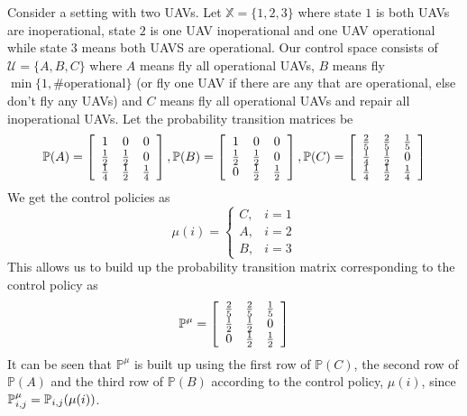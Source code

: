 \begin{example}
Consider a setting with two UAVs. Let $\mathbb{X}=\{1,2,3\}$ where state $1$ is both UAVs are inoperational, state $2$ is one UAV inoperational and one UAV operational while state $3$ means both UAVS are operational. Our control space consists of $\mathcal{U} = \{A,B,C\}$ where $A$ means fly all operational UAVs, $B$ means fly $\min\{1, \#\text{operational}\}$ (or fly one UAV if there are any that are operational, else don't fly any UAVs) and $C$ means fly all operational UAVs and repair all inoperational UAVs. Let the probability transition matrices be
\begin{align*}
\begin{split}
\mathbb{P}(A) = \left[\begin{array}{c c c} 1 & 0 & 0 \\ \frac{1}{2} & \frac{1}{2} & 0 \\ \frac{1}{4} & \frac{1}{2} & \frac{1}{4} \end{array}\right],
\mathbb{P}(B) = \left[\begin{array}{c c c} 1 & 0 & 0 \\ \frac{1}{2} & \frac{1}{2} & 0 \\ 0 & \frac{1}{2} & \frac{1}{2} \end{array}\right],
\mathbb{P}(C) = \left[\begin{array}{c c c} \frac{2}{5} & \frac{2}{5} & \frac{1}{5} \\ \frac{1}{4} & \frac{1}{2} & 0 \\ \frac{1}{4} & \frac{1}{2} & \frac{1}{4} \end{array}\right]
\end{split}
\end{align*}
We get the control policies as
$$\mu(i) = \begin{cases} C, & i=1 \\ A, & i=2 \\ B, & i=3 \end{cases}$$
This allows us to build up the probability transition matrix corresponding to the control policy as
$$\mathbb{P}^\mu = \left[\begin{array}{c c c} \frac{2}{5} & \frac{2}{5} & \frac{1}{5} \\ \frac{1}{2} & \frac{1}{2} & 0 \\ 0 & \frac{1}{2} & \frac{1}{2} \end{array}\right]$$
It can be seen that $\mathbb{P}^\mu$ is built up using the first row of $\mathbb{P}(C)$, the second row of $\mathbb{P}(A)$ and the third row of $\mathbb{P}(B)$ according to the control policy, $\mu(i)$, since $\mathbb{P}_{i,j}^\mu=\mathbb{P}_{i,j}(\mu(i))$.


\end{example}
